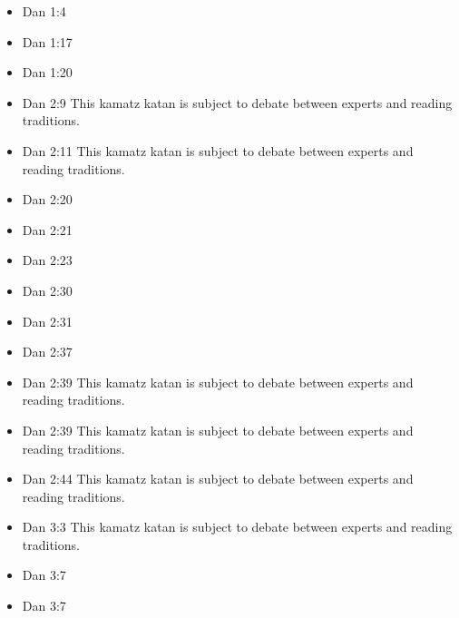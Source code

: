 \documentclass[14pt]{book}
\begin{document}
\begin{multicols}{2}\begin{itemize}

\item Dan 1:4

\item Dan 1:17

\item Dan 1:20

\item Dan 2:9 This kamatz katan is subject to debate between experts and reading traditions.

\item Dan 2:11 This kamatz katan is subject to debate between experts and reading traditions.

\item Dan 2:20

\item Dan 2:21

\item Dan 2:23

\item Dan 2:30

\item Dan 2:31

\item Dan 2:37

\item Dan 2:39 This kamatz katan is subject to debate between experts and reading traditions.

\item Dan 2:39 This kamatz katan is subject to debate between experts and reading traditions.

\item Dan 2:44 This kamatz katan is subject to debate between experts and reading traditions.

\item Dan 3:3 This kamatz katan is subject to debate between experts and reading traditions.

\item Dan 3:7

\item Dan 3:7


\end{itemize}
\end{multicols}
\end{document}
